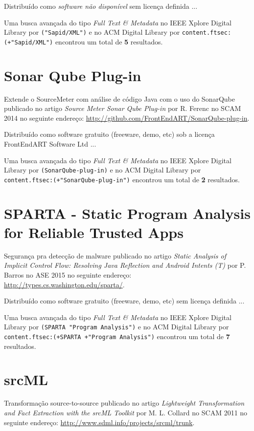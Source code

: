 Distribuído como {\it software não disponível}
sem licença definida ...


Uma busca avançada do tipo {\it Full Text \& Metadata} no IEEE Xplore Digital Library por
\texttt{("Sapid/XML")}
e no ACM Digital Library por
\texttt{content.ftsec:(+"Sapid/XML")}
encontrou um total de
{\bf 5}
resultados.

\section{Sonar Qube Plug-in}

Extende o SourceMeter com análise de código Java com o uso do SonarQube
publicado no artigo
{\it Source Meter Sonar Qube Plug-in}
por
R. Ferenc
no
SCAM
2014
no seguinte endereço:
\url{http://github.com/FrontEndART/SonarQube-plug-in}.

Distribuído como software gratuito (freeware, demo, etc)
sob a licença FrontEndART Software Ltd ...


Uma busca avançada do tipo {\it Full Text \& Metadata} no IEEE Xplore Digital Library por
\texttt{(SonarQube-plug-in)}
e no ACM Digital Library por
\texttt{content.ftsec:(+"SonarQube-plug-in")}
encontrou um total de
{\bf 2}
resultados.

\section{SPARTA - Static Program Analysis for Reliable Trusted Apps}

Segurança pra detecção de malware
publicado no artigo
{\it Static Analysis of Implicit Control Flow: Resolving Java Reflection and Android Intents (T)}
por
P. Barros
no
ASE
2015
no seguinte endereço:
\url{http://types.cs.washington.edu/sparta/}.

Distribuído como software gratuito (freeware, demo, etc)
sem licença definida ...


Uma busca avançada do tipo {\it Full Text \& Metadata} no IEEE Xplore Digital Library por
\texttt{(SPARTA "Program Analysis")}
e no ACM Digital Library por
\texttt{content.ftsec:(+SPARTA +"Program Analysis")}
encontrou um total de
{\bf 7}
resultados.

\section{srcML}

Transformação source-to-source
publicado no artigo
{\it Lightweight Transformation and Fact Extraction with the srcML Toolkit}
por
M. L. Collard
no
SCAM
2011
no seguinte endereço:
\url{http://www.sdml.info/projects/srcml/trunk}.

